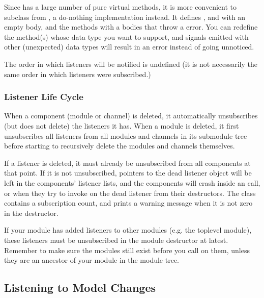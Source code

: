 Since  has a large number of pure virtual methods, it is more
convenient to subclass from , a do-nothing implementation
instead. It defines ,  and
 with an empty body, and the 
methods with a bodies that throw a  error.
You can redefine the  method(s) whose data type
you want to support, and signals emitted with other (unexpected) data
types will result in an error instead of going unnoticed.

The order in which listeners will be notified is undefined (it is not necessarily
the same order in which listeners were subscribed.)

\subsubsection{Listener Life Cycle}
\label{sec:simple-modules:signals:life-cycle}

When a component (module or channel) is deleted, it automatically
unsubscribes (but does not delete) the listeners it has. When a
module is deleted, it first unsubscribes all listeners from all
modules and channels in its submodule tree before starting
to recursively delete the modules and channels themselves.

If a listener is deleted, it must already be unsubscribed from all
components at that point. If it is not unsubscribed, pointers to the dead
listener object will be left in the components' listener lists, and the
components will crash inside an  call, or when they
try to invoke  on the dead listener from their
destructors. The  class contains a subscription count,
and prints a warning message when it is not zero in the destructor.

\begin{note}
  If your module has added listeners to other modules (e.g. the toplevel
  module), these listeners must be unsubscribed in the module
  destructor at latest. Remember to make sure the modules still exist before you
  call  on them, unless they are an ancestor
  of your module in the module tree.
\end{note}


\subsection{Listening to Model Changes}
\label{sec:ch-simple-modules:model-change}

